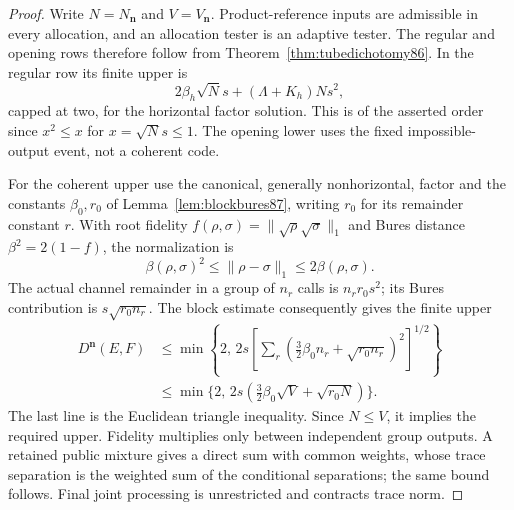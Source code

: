 \begin{proof}
Write $N=N_{\boldsymbol n}$ and $V=V_{\boldsymbol n}$.
Product-reference inputs are admissible in every allocation, and an
allocation tester is an adaptive tester.  The regular and opening
rows therefore follow from Theorem~\ref{thm:tubedichotomy86}.
In the regular row its finite upper is
\[
 2\beta_h\sqrt N s+(\Lambda+K_h)Ns^2,
\]
capped at two, for the horizontal factor solution.  This is of the
asserted order since $x^2\le x$ for $x=\sqrt N s\le1$.
The opening lower uses the fixed impossible-output event, not a
coherent code.

For the coherent upper use the canonical, generally nonhorizontal,
factor and the constants $\beta_0,r_0$ of
Lemma~\ref{lem:blockbures87}, writing $r_0$ for its remainder constant $r$.
With root fidelity
$f(\rho,\sigma)=\|\sqrt\rho\sqrt\sigma\|_1$ and Bures distance
$\beta^2=2(1-f)$, the normalization is
\[
 \beta(\rho,\sigma)^2\le\|\rho-\sigma\|_1
                         \le2\beta(\rho,\sigma).
\]
The actual channel remainder in a group of $n_r$ calls is
$n_r r_0s^2$; its Bures contribution is $s\sqrt{r_0n_r}$.
The block estimate consequently gives the finite upper
\begin{align}
 D^{\boldsymbol n}(E,F)
 &\le \min\left\{2,\,
  2s\left[\sum_r
      (\tfrac32\beta_0n_r+\sqrt{r_0n_r})^2\right]^{1/2}\right\}
                                                   \label{eq:profilefinite88}\\
 &\le\min\{2,\,2s(\tfrac32\beta_0\sqrt V+\sqrt{r_0N})\}.
                                                   \label{eq:profileminkowski88}
\end{align}
The last line is the Euclidean triangle inequality.  Since $N\le V$,
it implies the required upper.  Fidelity multiplies only between
independent group outputs.  A retained public mixture gives a direct
sum with common weights, whose trace separation is the weighted sum
of the conditional separations; the same bound follows.  Final
joint processing is unrestricted and contracts trace norm.


\end{proof}
